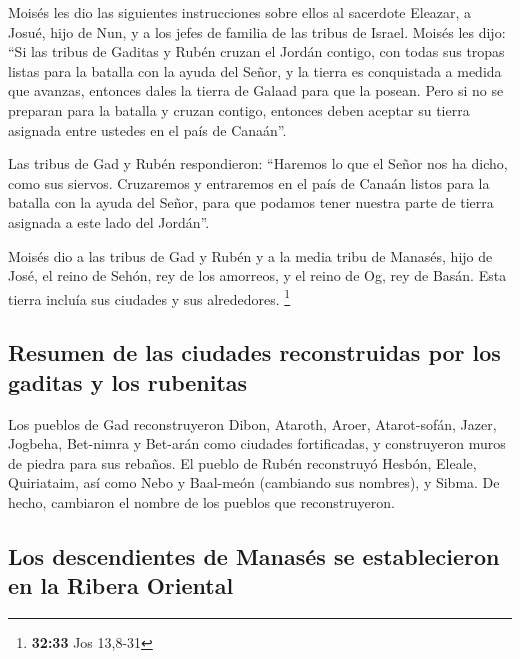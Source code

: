  Moisés les dio las siguientes instrucciones sobre ellos
al sacerdote Eleazar, a Josué, hijo de Nun, y a los jefes de familia de
las tribus de Israel.  Moisés les dijo: ``Si las tribus
de Gaditas y Rubén cruzan el Jordán contigo, con todas sus tropas listas
para la batalla con la ayuda del Señor, y la tierra es conquistada a
medida que avanzas, entonces dales la tierra de Galaad para que la
posean.  Pero si no se preparan para la batalla y cruzan
contigo, entonces deben aceptar su tierra asignada entre ustedes en el
país de Canaán''.

 Las tribus de Gad y Rubén respondieron: ``Haremos lo que
el Señor nos ha dicho, como sus siervos.  Cruzaremos y
entraremos en el país de Canaán listos para la batalla con la ayuda del
Señor, para que podamos tener nuestra parte de tierra asignada a este
lado del Jordán''.

 Moisés dio a las tribus de Gad y Rubén y a la media
tribu de Manasés, hijo de José, el reino de Sehón, rey de los amorreos,
y el reino de Og, rey de Basán. Esta tierra incluía sus ciudades y sus
alrededores. \footnote{\textbf{32:33} Jos 13,8-31}

\hypertarget{resumen-de-las-ciudades-reconstruidas-por-los-gaditas-y-los-rubenitas}{%
\subsection{Resumen de las ciudades reconstruidas por los gaditas y los
rubenitas}\label{resumen-de-las-ciudades-reconstruidas-por-los-gaditas-y-los-rubenitas}}

 Los pueblos de Gad reconstruyeron Dibon, Ataroth, Aroer,
 Atarot-sofán, Jazer, Jogbeha,  Bet-nimra
y Bet-arán como ciudades fortificadas, y construyeron muros de piedra
para sus rebaños.  El pueblo de Rubén reconstruyó Hesbón,
Eleale, Quiriataim,  así como Nebo y Baal-meón (cambiando
sus nombres), y Sibma. De hecho, cambiaron el nombre de los pueblos que
reconstruyeron.

\hypertarget{los-descendientes-de-manasuxe9s-se-establecieron-en-la-ribera-oriental}{%
\subsection{Los descendientes de Manasés se establecieron en la Ribera
Oriental}\label{los-descendientes-de-manasuxe9s-se-establecieron-en-la-ribera-oriental}}

